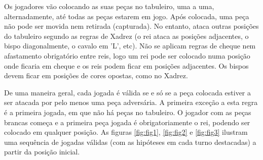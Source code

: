 \documentclass[a4paper]{article}
\begin{document}
Os jogadores vão colocando as suas peças no tabuleiro, uma a uma, alternadamente, até todas as peças estarem em jogo.
Após colocada, uma peça não pode ser movida nem retirada (capturada).
No entanto, ataca outras posições do tabuleiro segundo as regras de Xadrez (o rei ataca as posições adjacentes, o bispo diagonalmente, o cavalo em 'L', etc).
Não se aplicam regras de cheque nem afastamento obrigatório entre reis, logo um rei pode ser colocado numa posição onde ficaria em cheque e os reis podem ficar em posições adjacentes. Os bispos devem ficar em posições de cores opostas, como no Xadrez.\newline

De uma maneira geral, cada jogada é válida se e só se a peça colocada estiver a ser atacada por pelo menos uma peça adversária. A primeira exceção a esta regra é a primeira jogada, em que não há peças no tabuleiro. O jogador com as peças brancas começa e a primeira peça jogada é obrigatoriamente o rei, podendo ser colocado em qualquer posição.
As figuras \ref{fig:fig1}, \ref{fig:fig2} e \ref{fig:fig3} ilustram uma sequência de jogadas válidas (com as hipóteses em cada turno destacadas) a partir da posição inicial.
\end{document}
